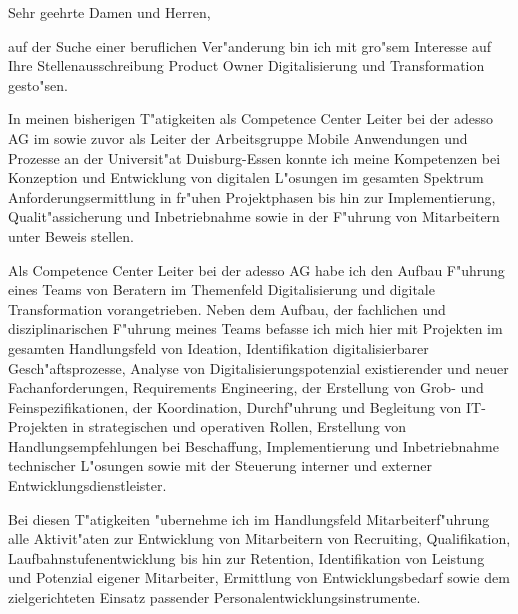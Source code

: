 \documentclass[10pt,a4paper]{dinbrief}
\date{\today}
\begin{document}
 
\begin{letter}  
{%
}
\subject{\bf Product Owner Digitalisierung und Transformation / Nummer 30260}
\opening{Sehr geehrte Damen und Herren,}
auf der Suche einer beruflichen Ver"anderung bin ich mit gro"sem Interesse auf Ihre Stellenausschreibung Product Owner Digitalisierung und Transformation  gesto"sen. 

In meinen bisherigen T"atigkeiten als Competence Center Leiter bei der adesso AG im sowie zuvor als Leiter der Arbeitsgruppe Mobile Anwendungen und  Prozesse an der Universit"at Duisburg-Essen konnte ich meine Kompetenzen bei Konzeption und Entwicklung von digitalen L"osungen im gesamten Spektrum Anforderungsermittlung in fr"uhen Projektphasen bis hin zur Implementierung, Qualit"assicherung und Inbetriebnahme sowie in der F"uhrung von Mitarbeitern unter Beweis stellen.


Als Competence Center Leiter bei der adesso AG habe ich den Aufbau F"uhrung eines Teams von Beratern im Themenfeld Digitalisierung und digitale Transformation vorangetrieben. Neben dem Aufbau, der fachlichen und disziplinarischen F"uhrung meines Teams befasse ich mich hier mit Projekten im gesamten Handlungsfeld von Ideation, Identifikation digitalisierbarer Gesch"aftsprozesse, Analyse von Digitalisierungspotenzial existierender und neuer Fachanforderungen, Requirements Engineering, der Erstellung von Grob- und Feinspezifikationen, der Koordination, Durchf"uhrung und Begleitung von IT-Projekten in strategischen und operativen Rollen, Erstellung von Handlungsempfehlungen bei Beschaffung, Implementierung und Inbetriebnahme technischer L"osungen sowie mit der Steuerung interner und externer Entwicklungsdienstleister. 

Bei diesen T"atigkeiten "ubernehme ich im Handlungsfeld Mitarbeiterf"uhrung alle Aktivit"aten zur Entwicklung von Mitarbeitern von Recruiting, Qualifikation, Laufbahnstufenentwicklung bis hin zur Retention, Identifikation von Leistung und Potenzial eigener Mitarbeiter, Ermittlung von Entwicklungsbedarf sowie dem zielgerichteten Einsatz passender Personalentwicklungsinstrumente.


\end{letter}
\end{document}
